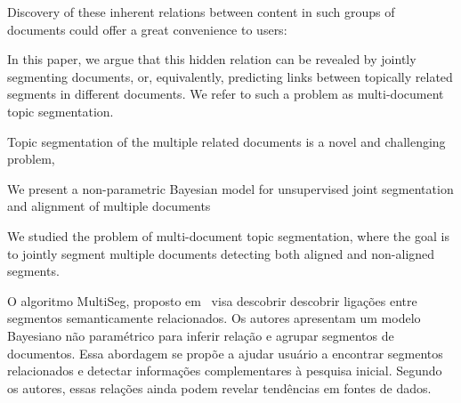 Discovery of these inherent relations between content in such
groups of documents could offer a great convenience to users:


In this paper, we argue that this hidden relation 
can be revealed by jointly segmenting documents, or,
equivalently, predicting links between topically related segments 
in different documents. We refer to such a problem
as multi-document topic segmentation.



Topic segmentation of the multiple related documents is
a novel and challenging problem,


We present a non-parametric Bayesian model for unsupervised 
joint segmentation and alignment of multiple documents


We studied the problem of multi-document topic segmentation, 
where the goal is to jointly segment multiple documents 
detecting both aligned and non-aligned segments.




O algoritmo MultiSeg, proposto em~\cite{} visa descobrir descobrir ligações entre segmentos semanticamente relacionados. Os autores apresentam um modelo Bayesiano não paramétrico para inferir relação e agrupar segmentos de documentos. Essa abordagem se propõe a ajudar usuário a encontrar segmentos relacionados e detectar informações complementares à pesquisa inicial. Segundo os autores, essas relações ainda podem revelar tendências em fontes de dados.

































